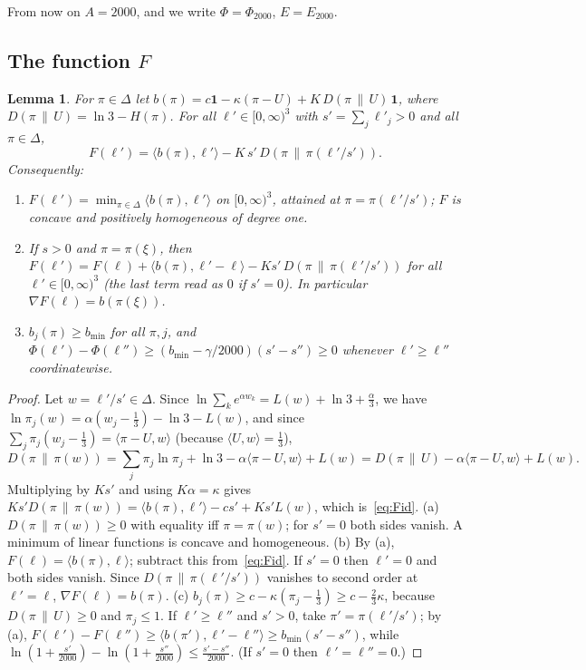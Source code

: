 \documentclass[11pt]{article}
\newtheorem{lemma}{Lemma}[section]
\theoremstyle{definition}
\numberwithin{equation}{section}
\newcommand{\one}{\mathbf 1}
\newcommand{\ip}[2]{\langle #1,#2\rangle}
\newcommand{\KL}[2]{D(#1\,\|\,#2)}
\newcommand{\Azero}{2000}
\newcommand{\bmin}{b_{\min}}
\begin{document}
From now on $A=\Azero$, and we write $\Phi=\Phi_{\Azero}$, $E=E_{\Azero}$.

\subsection{\texorpdfstring{The function $F$}{The function F}}

\begin{lemma}\label{lem:F}
For $\pi\in\Delta$ let $b(\pi)=c\one-\kappa(\pi-U)+K\,\KL\pi U\,\one$, where $\KL\pi U=\ln3-H(\pi)$. For all $\ell'\in[0,\infty)^3$
with $s'=\sum_j\ell'_j>0$ and all $\pi\in\Delta$,
\begin{equation}\label{eq:Fid}
F(\ell')=\ip{b(\pi)}{\ell'}-K\,s'\,\KL{\pi}{\pi(\ell'/s')} .
\end{equation}
Consequently:
\begin{enumerate}[label=(\alph*)]
\item $F(\ell')=\min_{\pi\in\Delta}\ip{b(\pi)}{\ell'}$ on $[0,\infty)^3$, attained at $\pi=\pi(\ell'/s')$; $F$ is concave and positively
homogeneous of degree one.
\item If $s>0$ and $\pi=\pi(\xi)$, then $F(\ell')=F(\ell)+\ip{b(\pi)}{\ell'-\ell}-K s'\,\KL\pi{\pi(\ell'/s')}$ for all
$\ell'\in[0,\infty)^3$ (the last term read as $0$ if $s'=0$). In particular $\nabla F(\ell)=b(\pi(\xi))$.
\item $b_j(\pi)\ge\bmin$ for all $\pi,j$, and $\Phi(\ell')-\Phi(\ell'')\ge(\bmin-\gamma/\Azero)(s'-s'')\ge0$ whenever $\ell'\ge\ell''$
coordinatewise.
\end{enumerate}
\end{lemma}
\begin{proof}
Let $w=\ell'/s'\in\Delta$. Since $\ln\sum_ke^{\alpha w_k}=L(w)+\ln3+\frac\alpha3$, we have $\ln\pi_j(w)=\alpha(w_j-\frac13)-\ln3-L(w)$,
and since $\sum_j\pi_j(w_j-\frac13)=\ip{\pi-U}w$ (because $\ip Uw=\frac13$),
\[
\KL\pi{\pi(w)}=\sum_j\pi_j\ln\pi_j+\ln3-\alpha\ip{\pi-U}w+L(w)=\KL\pi U-\alpha\ip{\pi-U}{w}+L(w).
\]
Multiplying by $Ks'$ and using $K\alpha=\kappa$ gives $Ks'\KL\pi{\pi(w)}=\ip{b(\pi)}{\ell'}-cs'+Ks'L(w)$, which is~\eqref{eq:Fid}.
(a) $\KL\pi{\pi(w)}\ge0$ with equality iff $\pi=\pi(w)$; for $s'=0$ both sides vanish. A minimum of linear functions is concave
and homogeneous. (b) By (a), $F(\ell)=\ip{b(\pi)}\ell$; subtract this from~\eqref{eq:Fid}. If $s'=0$ then $\ell'=0$ and both sides
vanish. Since $\KL\pi{\pi(\ell'/s')}$ vanishes to second order at $\ell'=\ell$, $\nabla F(\ell)=b(\pi)$. (c) $b_j(\pi)\ge
c-\kappa(\pi_j-\frac13)\ge c-\frac23\kappa$, because $\KL\pi U\ge0$ and $\pi_j\le1$. If $\ell'\ge\ell''$ and $s'>0$, take
$\pi'=\pi(\ell'/s')$; by (a), $F(\ell')-F(\ell'')\ge\ip{b(\pi')}{\ell'-\ell''}\ge\bmin(s'-s'')$, while
$\ln(1+\frac{s'}{\Azero})-\ln(1+\frac{s''}{\Azero})\le\frac{s'-s''}{\Azero}$. (If $s'=0$ then $\ell'=\ell''=0$.)
\end{proof}
\end{document}

